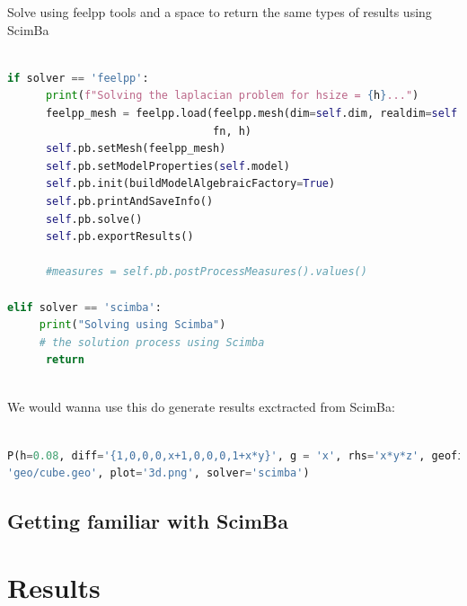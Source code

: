 \documentclass[12pt]{article}
\begin{document}
\newpage

Solve using feelpp tools and a space to return the same types of results using ScimBa

\begin{lstlisting}[language=Python,caption={},frame=single, backgroundcolor=\color{gray!10}, basicstyle=\footnotesize,rulecolor=\color{blue}, framexleftmargin=3pt, commentstyle=\color{mygreen}, keywordstyle=\color{blue}]

if solver == 'feelpp':
      print(f"Solving the laplacian problem for hsize = {h}...")
      feelpp_mesh = feelpp.load(feelpp.mesh(dim=self.dim, realdim=self.dim), 
                                fn, h)
      self.pb.setMesh(feelpp_mesh)
      self.pb.setModelProperties(self.model)
      self.pb.init(buildModelAlgebraicFactory=True)
      self.pb.printAndSaveInfo()
      self.pb.solve()
      self.pb.exportResults()
    
      #measures = self.pb.postProcessMeasures().values()

elif solver == 'scimba':
     print("Solving using Scimba")
     # the solution process using Scimba
      return
      
\end{lstlisting}

We would wanna use this do generate results exctracted from ScimBa:

\begin{lstlisting}[language=Python,caption={},frame=single, backgroundcolor=\color{gray!10}, basicstyle=\footnotesize,rulecolor=\color{blue}, framexleftmargin=3pt, commentstyle=\color{mygreen}, keywordstyle=\color{blue}]

P(h=0.08, diff='{1,0,0,0,x+1,0,0,0,1+x*y}', g = 'x', rhs='x*y*z', geofile = 
'geo/cube.geo', plot='3d.png', solver='scimba') 

\end{lstlisting}

\newpage

\subsection{Getting familiar with ScimBa}


\newpage

\section{Results}
\end{document}
